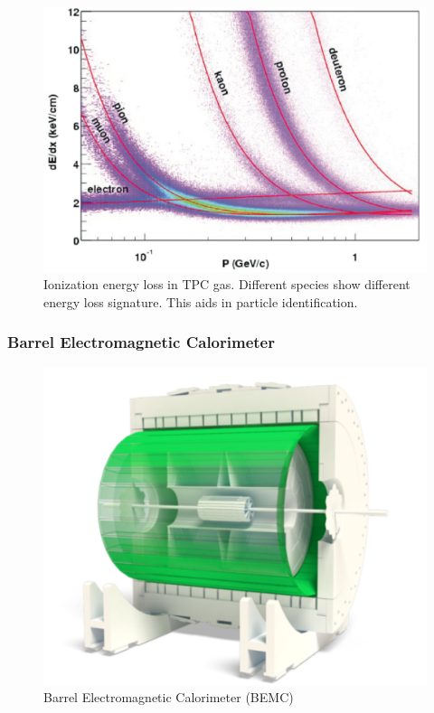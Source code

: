 \documentclass[abstract = on,listof=totoc, bibliography=totoc]{scrreprt}
\begin{document}
\begin{figure}
\begin{center}
\includegraphics[width = 1\textwidth]{tpc_dEdx}
\caption[Ionization energy loss in TPC gas]{Ionization energy loss in TPC gas. Different species show different energy loss signature. This aids in particle identification.}
\label{fig:tpc_dEdx}
\end{center}
\end{figure}

\FloatBarrier
\subsubsection[BEMC]{Barrel Electromagnetic Calorimeter}


\begin{figure}[h!]
\begin{center}
\includegraphics[width = .7\textwidth]{BEMC}
\caption[BEMC]{Barrel Electromagnetic Calorimeter (BEMC)}
\label{fig:BEMC}
\end{center}
\end{figure}
\end{document}
